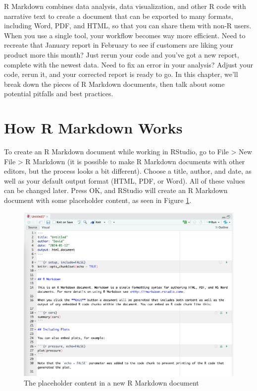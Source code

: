 \documentclass[
]{book}
\begin{document}
R Markdown combines data analysis, data visualization, and other R code with narrative text to create a document that can be exported to many formats, including Word, PDF, and HTML, so that you can share them with non-R users. When you use a single tool, your workflow becomes way more efficient. Need to recreate that January report in February to see if customers are liking your product more this month? Just rerun your code and you've got a new report, complete with the newest data. Need to fix an error in your analysis? Adjust your code, rerun it, and your corrected report is ready to go.
In this chapter, we'll break down the pieces of R Markdown documents, then talk about some potential pitfalls and best practices.

\hypertarget{how-r-markdown-works}{%
\section*{How R Markdown Works}\label{how-r-markdown-works}}

To create an R Markdown document while working in RStudio, go to File \textgreater{} New File \textgreater{} R Markdown (it is possible to make R Markdown documents with other editors, but the process looks a bit different). Choose a title, author, and date, as well as your default output format (HTML, PDF, or Word). All of these values can be changed later. Press OK, and RStudio will create an R Markdown document with some placeholder content, as seen in Figure \ref{fig:default-rmd-content}.

\begin{figure}
\includegraphics[width=1\linewidth]{assets/default-rmd-content} \caption{The placeholder content in a new R Markdown document}\label{fig:default-rmd-content}
\end{figure}
\end{document}
